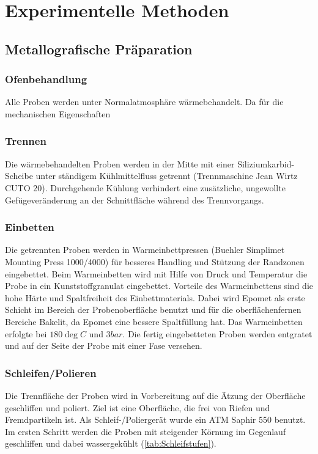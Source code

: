 \chapter{Experimentelle Methoden}

\section {Metallografische Präparation}


\subsection{Ofenbehandlung }
Alle Proben werden unter Normalatmosphäre wärmebehandelt. Da für die mechanischen Eigenschaften 



\subsection{Trennen}
Die wärmebehandelten Proben werden in der Mitte mit einer Siliziumkarbid-Scheibe unter ständigem Kühlmittelfluss getrennt (Trennmaschine Jean Wirtz CUTO 20). Durchgehende Kühlung  verhindert eine zusätzliche, ungewollte Gefügeveränderung an der Schnittfläche während des Trennvorgangs.


\subsection{Einbetten}
Die getrennten Proben werden in Warmeinbettpressen (Buehler Simplimet Mounting Press 1000/4000) für besseres Handling und Stützung der Randzonen eingebettet. Beim Warmeinbetten wird mit Hilfe von Druck und Temperatur die Probe in ein Kunststoffgranulat eingebettet. Vorteile des Warmeinbettens sind die hohe Härte und Spaltfreiheit des Einbettmaterials. Dabei wird Epomet als erste Schicht im Bereich der Probenoberfläche benutzt und für die oberflächenfernen Bereiche Bakelit, da Epomet eine bessere Spaltfüllung hat. Das Warmeinbetten erfolgte bei $180 \deg C$ und $3 bar$. 
Die fertig eingebetteten Proben werden entgratet und auf der Seite der Probe mit einer Fase versehen.  


\subsection{Schleifen/Polieren}

Die Trennfläche der Proben wird in Vorbereitung auf die Ätzung der Oberfläche geschliffen und poliert. Ziel ist eine Oberfläche, die frei von Riefen und Fremdpartikeln ist. Als Schleif-/Poliergerät wurde ein ATM Saphir 550 benutzt.
Im ersten Schritt werden die Proben mit steigender Körnung im Gegenlauf geschliffen und dabei wassergekühlt (\ref{tab:Schleifstufen}). 

